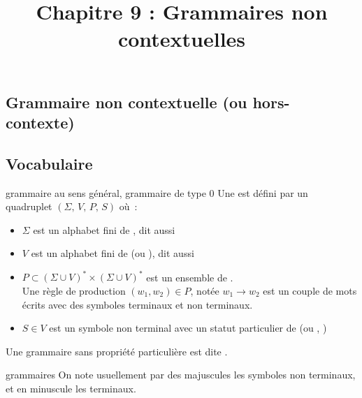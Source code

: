 

\begin{adjustwidth}{-3cm}{-3cm}

\setcounter{chapitre}{9}
\title{Chapitre 9 : Grammaires non contextuelles}
\maketitle

\section{Grammaire non contextuelle (ou hors-contexte)}

\subsection{Vocabulaire}

\begin{definition}{}{grammaire au sens général, grammaire de type 0}
    Une  est défini par un quadruplet $(\Sigma,\,V,\,P,\,S)$ où~:
    \begin{itemize}
        \item $\Sigma$ est un alphabet fini de , dit aussi 
        \item $V$ est un alphabet fini de  (ou ), dit aussi 
        \item $P \subset (\Sigma \cup V)^* \times (\Sigma \cup V)^* $ est un ensemble de .\\
        Une règle de production $(w_1,w_2) \in P$, notée $w_1 \to w_2$ est un couple de mots écrits avec des symboles terminaux et non terminaux.
        \item $S \in V$ est un symbole non terminal avec un statut particulier de  (ou , )
    \end{itemize}
    Une grammaire sans propriété particulière est dite .
\end{definition}

\begin{remarque}{}{grammaires}
    On note usuellement par des majuscules les symboles non terminaux, et en minuscule les terminaux.
\end{remarque}


\end{adjustwidth}
